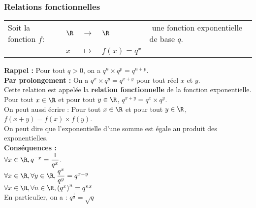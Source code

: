 \newpage


\subsubsection{Relations fonctionnelles}

\begin{tabular}{lllll}
Soit la fonction $f:$ & $\R$ & $\longrightarrow$ & $\R$ & $\! \! \! \! \! \! \! \! \! \! \! \! \! \! \! \! \! \! \! \! \! \! \! \! \! \! \! \! \! \! \! \! \! \! \! \! \! $ une fonction exponentielle de base $q$. \\
& $x$ & $\longmapsto$ & $f(x) = q^x$ & \\ 
\end{tabular}

\vspace*{.3cm}

\textbf{Rappel :} Pour tout $q > 0$, on a $q^n \times q^p = q^{n + p}$. \\

\textbf{Par prolongement :} On a $q^x \times q^y = q^{x + y}$ pour tout réel $x$ et $y$. \\

Cette relation est appelée la \textbf{relation fonctionnelle} de la fonction exponentielle. \\

Pour tout $x \in \R$ et pour tout $y \in \R$, $q^{x + y} = q^x \times q^y$. \\

On peut aussi écrire : Pour tout $x \in \R$ et pour tout $y \in \R$, $f\left(x + y\right) = f\left(x\right) \times f\left(y\right)$. \\

On peut dire que l'exponentielle d'une somme est égale au produit des exponentielles. \\

\textbf{Conséquences :} \\

$\forall x \in \R, q^{-x} = \dfrac{1}{q^x}$. \\

$\forall x \in \R, \forall y \in \R, \dfrac{q^x}{q^y} = q^{x - y}$ \\

$\forall x \in \R, \forall n \in \R, \left(q^x\right)^n = q^{nx}$ \\

En particulier, on a : $q^{\frac{1}{2}} = \sqrt{q}$ \\

